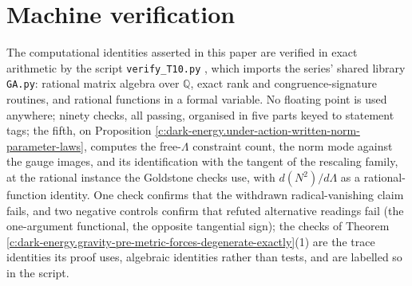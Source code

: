 \documentclass[11pt]{article}
\theoremstyle{definition}
\theoremstyle{plain}
\begin{document}
\section{Machine verification}

\label{c:note.dark-energy.setting-machine-verification}
The computational identities asserted in this paper are verified in exact arithmetic by the script \texttt{verify\_T10.py} \cite{ButlerVerifyT10}, which imports the series' shared library \texttt{GA.py}: rational matrix algebra over $\mathbb{Q}$, exact rank and congruence-signature routines, and rational functions in a formal variable. No floating point is used anywhere; ninety checks, all passing, organised in five parts keyed to statement tags; the fifth, on Proposition \ref{c:dark-energy.under-action-written-norm-parameter-laws}, computes the free-$\Lambda$ constraint count, the norm mode against the gauge images, and its identification with the tangent of the rescaling family, at the rational instance the Goldstone checks use, with $d(N^2)/d\Lambda$ as a rational-function identity. One check confirms that the withdrawn radical-vanishing claim fails, and two negative controls confirm that refuted alternative readings fail (the one-argument functional, the opposite tangential sign); the checks of Theorem \ref{c:dark-energy.gravity-pre-metric-forces-degenerate-exactly}(1) are the trace identities its proof uses, algebraic identities rather than tests, and are labelled so in the script.
\end{document}
